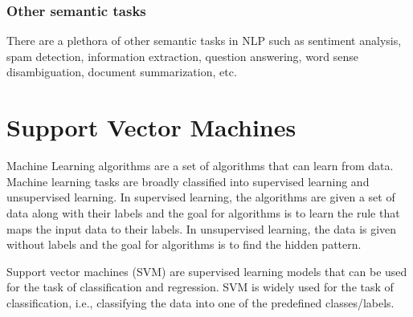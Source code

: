 \subsubsection{Other semantic tasks}

There are a plethora of other semantic tasks in NLP such as sentiment analysis, spam detection, information extraction, question answering, word sense disambiguation, document summarization, etc.



\section{Support Vector Machines}\label{sec:SVM}

Machine Learning algorithms are a set of algorithms that can learn from data. Machine learning tasks are broadly classified into supervised learning and unsupervised learning. In supervised learning, the algorithms are given a set of data along with their labels and the goal for algorithms is to learn the rule that maps the input data to their labels. In unsupervised learning, the data is given without labels and the goal for algorithms is to find the hidden pattern.

Support vector machines (SVM) are supervised learning models that can be used for the task of classification and regression. SVM is widely used for the task of classification, i.e., classifying the data into one of the predefined classes/labels.

